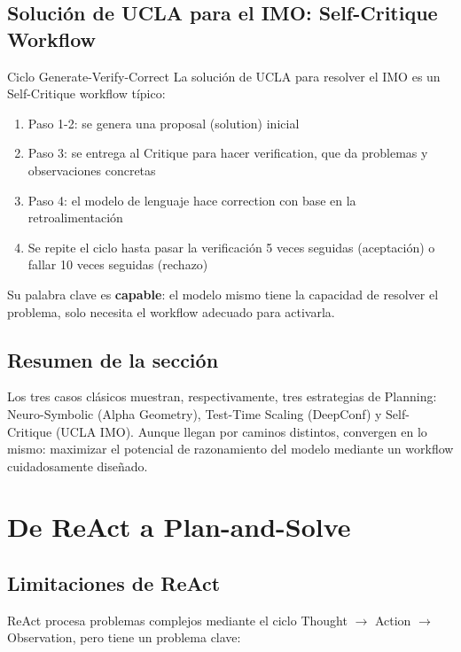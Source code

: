\documentclass[a4paper]{article}
\begin{document}
\subsection{Solución de UCLA para el IMO: Self-Critique Workflow}

\begin{importantbox}{Ciclo Generate-Verify-Correct}
La solución de UCLA para resolver el IMO es un Self-Critique workflow típico:
\begin{enumerate}
    \item Paso 1-2: se genera una proposal (solution) inicial
    \item Paso 3: se entrega al Critique para hacer verification, que da problemas y observaciones concretas
    \item Paso 4: el modelo de lenguaje hace correction con base en la retroalimentación
    \item Se repite el ciclo hasta pasar la verificación 5 veces seguidas (aceptación) o fallar 10 veces seguidas (rechazo)
\end{enumerate}
Su palabra clave es \textbf{capable}: el modelo mismo tiene la capacidad de resolver el problema, solo necesita el workflow adecuado para activarla.
\end{importantbox}

\subsection{Resumen de la sección}

Los tres casos clásicos muestran, respectivamente, tres estrategias de Planning: Neuro-Symbolic (Alpha Geometry), Test-Time Scaling (DeepConf) y Self-Critique (UCLA IMO). Aunque llegan por caminos distintos, convergen en lo mismo: maximizar el potencial de razonamiento del modelo mediante un workflow cuidadosamente diseñado.

\section{De ReAct a Plan-and-Solve}

\subsection{Limitaciones de ReAct}

ReAct procesa problemas complejos mediante el ciclo Thought $\rightarrow$ Action $\rightarrow$ Observation, pero tiene un problema clave:
\end{document}
